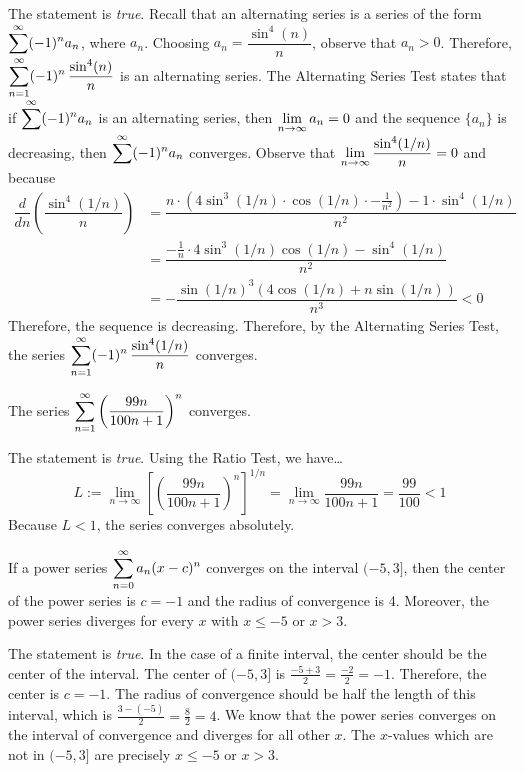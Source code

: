 \documentclass[11pt,letterpaper]{article}
\begin{document}
\sol The statement is \textit{true}. Recall that an alternating series is a series of the form $\displaystyle\sum^\infty (-1)^n a_n$, where $a_n$. Choosing $a_n= \dfrac{\sin^4(n)}{n}$, observe that $a_n > 0$. Therefore, $\displaystyle\sum_{n=1}^\infty (-1)^n\, \dfrac{\sin^4(n)}{n}$ is an alternating series. The Alternating Series Test states that if $\displaystyle\sum^\infty (-1)^n a_n$ is an alternating series, then $\displaystyle\lim_{n \to \infty} a_n= 0$ and the sequence $\{ a_n \}$ is decreasing, then $\displaystyle\sum^\infty (-1)^n a_n$ converges. Observe that $\displaystyle\lim_{n \to \infty} \dfrac{\sin^4(1/n)}{n}= 0$ and because 
	\[
	\begin{aligned}
	\dfrac{d}{dn} \left( \dfrac{\sin^4(1/n)}{n} \right)&= \dfrac{n \cdot (4 \sin^3(1/n) \cdot \cos(1/n) \cdot -\frac{1}{n^2}) - 1 \cdot \sin^4(1/n)}{n^2} \\
	&= \dfrac{-\frac{1}{n} \cdot 4 \sin^3(1/n) \cos(1/n) - \sin^4(1/n)}{n^2} \\
	&= -\dfrac{\sin(1/n)^3 \left(4 \cos(1/n) + n \sin(1/n) \right)}{n^3} < 0
	\end{aligned}
	\]
Therefore, the sequence is decreasing. Therefore, by the Alternating Series Test, the series $\displaystyle\sum_{n=1}^\infty (-1)^n\, \dfrac{\sin^4(1/n)}{n}$ converges. \pvspace{1.3cm}



 The series $\displaystyle\sum_{n=1}^\infty \left( \dfrac{99n}{100n + 1} \right)^n$ converges. \pspace

\sol The statement is \textit{true}. Using the Ratio Test, we have\dots
	\[
	L:= \lim_{n \to \infty} \left[ \left( \dfrac{99n}{100n + 1} \right)^n \right]^{1/n}= \lim_{n \to \infty} \dfrac{99n}{100n + 1}= \dfrac{99}{100} < 1
	\]
Because $L < 1$, the series converges absolutely. \pvspace{1.3cm}



 If a power series $\displaystyle \sum_{n=0}^\infty a_n (x - c)^n$ converges on the interval $(-5, 3]$, then the center of the power series is $c= -1$ and the radius of convergence is 4. Moreover, the power series diverges for every $x$ with $x \leq -5$ or $x > 3$. \pspace

\sol The statement is \textit{true}. In the case of a finite interval, the center should be the center of the interval. The center of $(-5, 3]$ is $\frac{-5 + 3}{2}= \frac{-2}{2}= -1$. Therefore, the center is $c= -1$. The radius of convergence should be half the length of this interval, which is $\frac{3 - (-5)}{2}= \frac{8}{2}= 4$. We know that the power series converges on the interval of convergence and diverges for all other $x$. The $x$-values which are not in $(-5, 3]$ are precisely $x \leq -5$ or $x > 3$. \pvspace{1.3cm}
\end{document}
